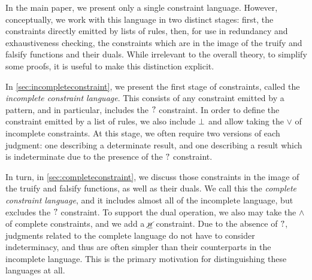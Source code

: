 \documentclass{article}
\begin{document}
In the main paper, we present only a single constraint language. However, conceptually, we work with this language in two distinct stages: first, the constraints directly emitted by lists of rules, then, for use in redundancy and exhaustiveness checking, the constraints which are in the image of the truify and falsify functions and their duals. While irrelevant to the overall theory, to simplify some proofs, it is useful to make this distinction explicit.

In \autoref{sec:incompleteconstraint}, we present the first stage of constraints, called the \emph{incomplete constraint language}. This consists of any constraint emitted by a pattern, and in particular, includes the $\mathtt{?}$ constraint. In order to define the constraint emitted by a list of rules, we also include $\bot$ and allow taking the $\vee$ of incomplete constraints. At this stage, we often require two versions of each judgment: one describing a determinate result, and one describing a result which is indeterminate due to the presence of the $\mathtt{?}$ constraint.

In turn, in \autoref{sec:completeconstraint}, we discuss those constraints in the image of the truify and falsify functions, as well as their duals. We call this the \emph{complete constraint language}, and it includes almost all of the incomplete language, but excludes the $\mathtt{?}$ constraint. To support the dual operation, we also may take the $\wedge$ of complete constraints, and we add a $\underline{\cancel{n}}$ constraint. Due to the absence of $\mathtt{?}$, judgments related to the complete language do not have to consider indeterminacy, and thus are often simpler than their counterparts in the incomplete language. This is the primary motivation for distinguishing these languages at all.



\pagebreak



\end{document}
